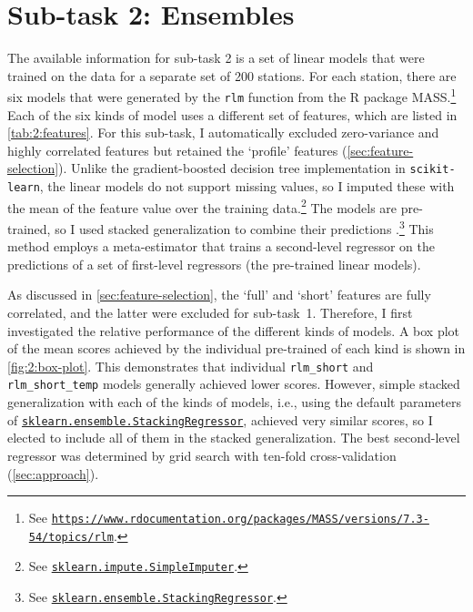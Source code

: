 \documentclass[11pt]{extarticle}
\newcommand{\rlmshort}{\texttt{rlm\_short}}
\newcommand{\rlmshorttemp}{\texttt{rlm\_short\_temp}}
\newcommand{\sklearn}[2]{\href{https://scikit-learn.org/stable/modules/generated/sklearn.#1.#2.html}{\lstinline|sklearn.#1.#2|}}
\begin{document}
\section{Sub-task 2: Ensembles}
\label{sec:results-subtask-2}

The available information for sub-task 2 is a set of linear models that were trained on
the data for a separate set of 200 stations.
For each station, there are six models that were generated by the \texttt{rlm} function
from the R package MASS.\footnote{See
  \href{https://www.rdocumentation.org/packages/MASS/versions/7.3-54/topics/rlm}{\texttt{https://www.rdocumentation.org/packages/MASS/versions/7.3-54/topics/rlm}}.
}
Each of the six kinds of model uses a different set of features, which are listed in
\cref{tab:2:features}.
For this sub-task, I automatically excluded zero-variance and highly correlated
features but retained the `profile' features (\cref{sec:feature-selection}).
Unlike the gradient-boosted decision tree implementation in \texttt{scikit-learn}, the
linear models do not support missing values, so I imputed these with the mean of the
feature value over the training data.\footnote{See \sklearn{impute}{SimpleImputer}.
}
The models are pre-trained, so I used stacked generalization to combine their
predictions \parencite{Wolpert1992}.\footnote{See
  \sklearn{ensemble}{StackingRegressor}.
}
This method employs a meta-estimator that trains a second-level regressor on the
predictions of a set of first-level regressors (the pre-trained linear models).

As discussed in \cref{sec:feature-selection}, the `full' and `short' features are fully
correlated, and the latter were excluded for sub-task~1.
Therefore, I first investigated the relative performance of the different kinds of
models.
A box plot of the mean scores achieved by the individual pre-trained of each kind is
shown in \cref{fig:2:box-plot}.
This demonstrates that individual \rlmshort{} and \rlmshorttemp{} models generally
achieved lower scores.
However, simple stacked generalization with each of the kinds of models, i.e., using
the default parameters of \sklearn{ensemble}{StackingRegressor}, achieved very similar
scores, so I elected to include all of them in the stacked generalization.
The best second-level regressor was determined by grid search with ten-fold
cross-validation (\cref{sec:approach}).
\end{document}
